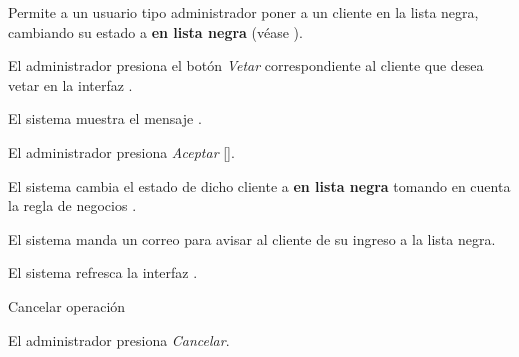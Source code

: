 %
%

{
  Permite a un usuario tipo administrador poner a un cliente en la lista negra,
  cambiando su estado a \textbf{en lista negra} (véase
  ).

  \begin{trayectoriaPrincipal}

    \item El administrador presiona el botón \textit{Vetar}
      correspondiente al cliente que desea vetar en la interfaz
      .

    \item El sistema muestra el mensaje .

    \item El administrador presiona \textit{Aceptar}
      [].

    \item El sistema cambia el estado de dicho cliente a \textbf{en lista negra}
      tomando en cuenta la regla de negocios .

    \item El sistema manda un correo para avisar al cliente de su
      ingreso a la lista negra.

    \item El sistema refresca la interfaz .

  \end{trayectoriaPrincipal}

  \begin{trayectoriaAlternativa}[ta:cancelar]
    {Cancelar operación}

    \item El administrador presiona \textit{Cancelar}.

  \end{trayectoriaAlternativa}
}
